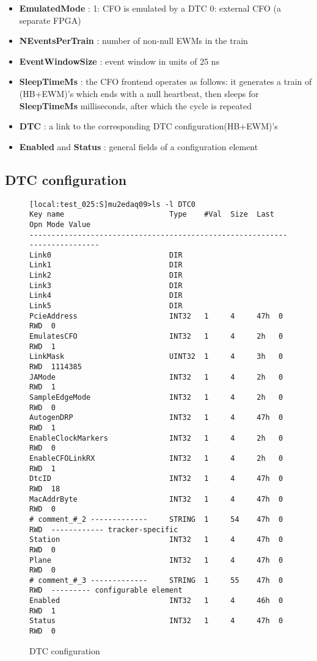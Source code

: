 \begin{itemize}
\item
  {\bf EmulatedMode} : 1: CFO is emulated by a DTC 
  0: external CFO (a separate FPGA)
\item
  {\bf NEventsPerTrain} : number of non-null EWMs in the train
\item
  {\bf EventWindowSize} : event window in units of 25 ns
\item
  {\bf SleepTimeMs}     : the CFO frontend operates as follows: it generates a train of (HB+EWM)'s
  which ends with a null heartbeat, then sleeps for {\bf SleepTimeMs} milliseconds, after which
  the cycle is repeated
\item
  {\bf DTC}     : a link to the corresponding DTC configuration(HB+EWM)'s
\item
  {\bf Enabled} and {\bf Status} : general fields of a configuration element
\end{itemize}

\subsection {DTC configuration}

\begin{figure}[H]
{ \scriptsize
\begin{verbatim}
[local:test_025:S]mu2edaq09>ls -l DTC0
Key name                        Type    #Val  Size  Last Opn Mode Value
---------------------------------------------------------------------------
Link0                           DIR
Link1                           DIR
Link2                           DIR
Link3                           DIR
Link4                           DIR
Link5                           DIR
PcieAddress                     INT32   1     4     47h  0   RWD  0
EmulatesCFO                     INT32   1     4     2h   0   RWD  1
LinkMask                        UINT32  1     4     3h   0   RWD  1114385
JAMode                          INT32   1     4     2h   0   RWD  1
SampleEdgeMode                  INT32   1     4     2h   0   RWD  0
AutogenDRP                      INT32   1     4     47h  0   RWD  1
EnableClockMarkers              INT32   1     4     2h   0   RWD  0
EnableCFOLinkRX                 INT32   1     4     2h   0   RWD  1
DtcID                           INT32   1     4     47h  0   RWD  18
MacAddrByte                     INT32   1     4     47h  0   RWD  0
# comment_#_2 -------------     STRING  1     54    47h  0   RWD  ------------ tracker-specific 
Station                         INT32   1     4     47h  0   RWD  0
Plane                           INT32   1     4     47h  0   RWD  0
# comment_#_3 -------------     STRING  1     55    47h  0   RWD  --------- configurable element 
Enabled                         INT32   1     4     46h  0   RWD  1
Status                          INT32   1     4     47h  0   RWD  0
\end{verbatim}
  }
\caption{
  \label{figure:dtc_config}
  DTC configuration
}
\end{figure}


